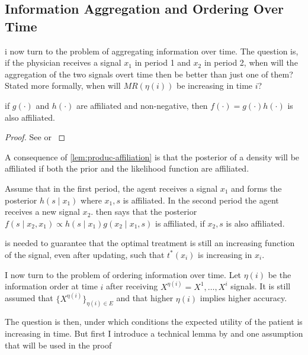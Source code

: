 \subsection{Information Aggregation and Ordering Over Time}
i now turn to the problem of aggregating information over time. The question is, if the physician receives a signal \(x_1\) in period 1 and \(x_2\) in period 2, when will the aggregation of the two signals overt time then be better than just one of them? Stated more formally, when will \(MR(\eta(i))\) be increasing in time \(i\)?

\begin{lemma}\label{lem:produc-affiliation}
	if \(g(\cdot)\) and \(h(\cdot)\) are affiliated and non-negative, then \(f(\cdot)=g(\cdot)h(\cdot)\) is also affiliated.
\end{lemma}
\begin{proof}
	See \textcite{Milgrom1982a} or \textcite[Collary 2.6.3]{Topkis1998}
\end{proof}
A consequence of \cref{lem:produc-affiliation} is that the posterior of a density will be affiliated if both the prior and the likelihood function are affiliated.

\begin{example}
 Assume that in the first period, the agent receives a signal \(x_1\) and forms the posterior \(h(s\mid x_1)\) where \(x_1,s\) is affiliated. In the second period the agent receives a new signal \(x_2\).  then says that the posterior \(f(s\mid x_2,x_1) \propto h(s\mid x_1)g(x_2\mid x_1,s)\) is affiliated, if \(x_2,s\) is also affiliated.
 \end{example}

 is needed to guarantee that the optimal treatment is still an increasing function of the signal, even after updating, such that \(t^*(x_i)\) is increasing in \(x_i\).

I now turn to the problem of ordering information over time. Let \(\eta(i)\) be the information order at time \(i\) after receiving \({X}^{\eta(i)}=X^{1},\ldots,X^{i}\) signals. It is still assumed that \(\{{X}^{\eta(i)}\}_{\eta(i)\in E}\) and that higher \(\eta(i)\) implies higher accuracy.

The question is then, under which conditions the expected utility of the patient is increasing in time. But first I introduce a technical lemma by \textcite{Persico1996} and one assumption that will be used in the proof


